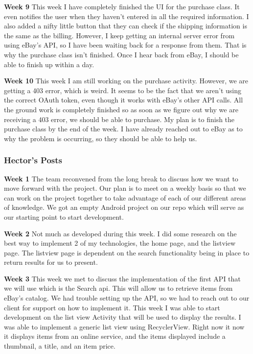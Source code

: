 \documentclass[journal,compsoc, 10pt, draftclsnofoot, onecolumn]{IEEEtran}
\begin{document}
\textbf{Week 9}\newline
This week I have completely finished the UI for the purchase class. It even notifies the user
when they haven't entered in all the required information. I also added a nifty little button
that they can check if the shipping information is the same as the billing. However, I keep
getting an internal server error from using eBay's API, so I have been waiting back for a
response from them. That is why the purchase class isn't finished. Once I hear back from eBay,
I should be able to finish up within a day. \newline

\textbf{Week 10}\newline
This week I am still working on the purchase activity. However, we are getting a 403 error,
which is weird. It seems to be the fact that we aren't using the correct OAuth token, even
though it works with eBay's other API calls. All the ground work is completely finished so as
soon as we figure out why we are receiving a 403 error, we should be able to purchase. My plan
is to finish the purchase class by the end of the week. I have already reached out to eBay as
to why the problem is occurring, so they should be able to help us.\newline

\subsubsection*{Hector's Posts}
\textbf{Week 1}\newline
The team reconvened from the long break to discuss how we want to move forward with the
project. Our plan is to meet on a weekly basis so that we can work on the project together to
take advantage of each of our different areas of knowledge. We got an empty Android project on
our repo which will serve as our starting point to start development.\newline

\textbf{Week 2}\newline
Not much as developed during this week. I did some research on the best way to implement 2 of
my technologies, the home page, and the listview page. The listview page is dependent on the
search functionality being in place to return results for us to present.\newline

\textbf{Week 3}\newline
This week we met to discuss the implementation of the first API that we will use which is the
Search api. This will allow us to retrieve items from eBay's catalog. We had trouble setting up 
the API, so we had to reach out to our client for support on how to implement it. This week I
was able to start development on the list view Activity that will be used to display the
results. I was able to implement a generic list view using RecyclerView. Right now it now it
displays items from an online service, and the items displayed include a thumbnail, a title,
and an item price.\newline
\end{document}
